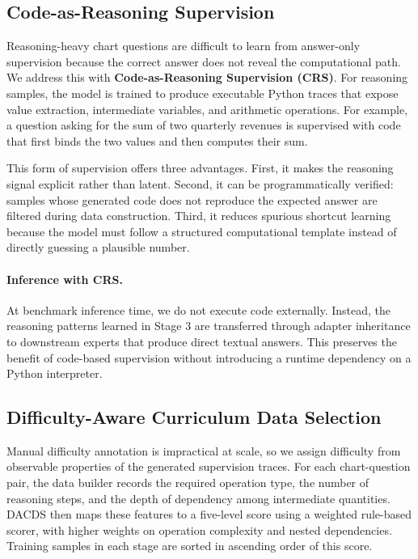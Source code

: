 \documentclass[journal]{IEEEtran}
\newcommand{\crs}{CRS}
\newcommand{\dacds}{DACDS}
\begin{document}
\subsection{Code-as-Reasoning Supervision}
\label{sec:crs}
Reasoning-heavy chart questions are difficult to learn from answer-only supervision because the correct answer does not reveal the computational path.
We address this with \textbf{Code-as-Reasoning Supervision (\crs{})}.
For reasoning samples, the model is trained to produce executable Python traces that expose value extraction, intermediate variables, and arithmetic operations.
For example, a question asking for the sum of two quarterly revenues is supervised with code that first binds the two values and then computes their sum.

This form of supervision offers three advantages.
First, it makes the reasoning signal explicit rather than latent.
Second, it can be programmatically verified: samples whose generated code does not reproduce the expected answer are filtered during data construction.
Third, it reduces spurious shortcut learning because the model must follow a structured computational template instead of directly guessing a plausible number.

\paragraph{Inference with \crs{}.}
At benchmark inference time, we do not execute code externally.
Instead, the reasoning patterns learned in Stage 3 are transferred through adapter inheritance to downstream experts that produce direct textual answers.
This preserves the benefit of code-based supervision without introducing a runtime dependency on a Python interpreter.

\subsection{Difficulty-Aware Curriculum Data Selection}
\label{sec:dacds}
Manual difficulty annotation is impractical at scale, so we assign difficulty from observable properties of the generated supervision traces.
For each chart-question pair, the data builder records the required operation type, the number of reasoning steps, and the depth of dependency among intermediate quantities.
\dacds{} then maps these features to a five-level score using a weighted rule-based scorer, with higher weights on operation complexity and nested dependencies.
Training samples in each stage are sorted in ascending order of this score.
\end{document}

